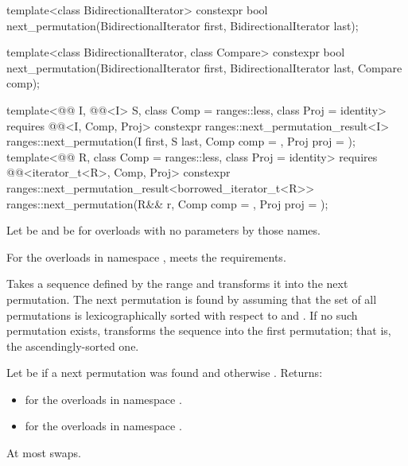%
\begin{itemdecl}
template<class BidirectionalIterator>
  constexpr bool next_permutation(BidirectionalIterator first,
                                  BidirectionalIterator last);

template<class BidirectionalIterator, class Compare>
  constexpr bool next_permutation(BidirectionalIterator first,
                                  BidirectionalIterator last, Compare comp);

template<@@ I, @@<I> S, class Comp = ranges::less,
         class Proj = identity>
  requires @@<I, Comp, Proj>
  constexpr ranges::next_permutation_result<I>
    ranges::next_permutation(I first, S last, Comp comp = {}, Proj proj = {});
template<@@ R, class Comp = ranges::less,
         class Proj = identity>
  requires @@<iterator_t<R>, Comp, Proj>
  constexpr ranges::next_permutation_result<borrowed_iterator_t<R>>
    ranges::next_permutation(R&& r, Comp comp = {}, Proj proj = {});
\end{itemdecl}

\begin{itemdescr}
\pnum
Let  be 
and  be 
for overloads with no parameters by those names.

\pnum
\expects
For the overloads in namespace ,
 meets
the  requirements.

\pnum
\effects
Takes a sequence defined by the range 
and transforms it into the next permutation.
The next permutation is found by assuming that the set of all permutations
is lexicographically sorted with respect to  and .
If no such permutation exists,
transforms the sequence into the first permutation;
that is, the ascendingly-sorted one.

\pnum
\returns
Let  be  if a next permutation was found and
otherwise .
Returns:
\begin{itemize}
\item {} for the overloads in namespace .
\item {} for the overloads in namespace .
\end{itemize}

\pnum
\complexity
At most  swaps.
\end{itemdescr}

